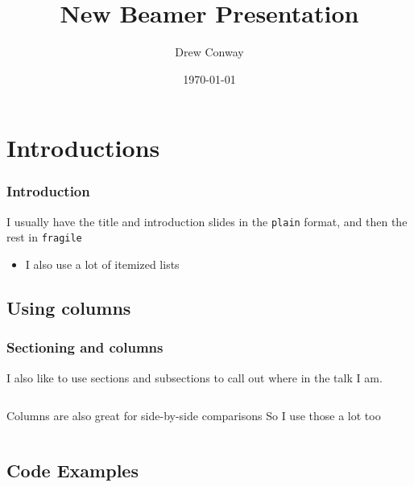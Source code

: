 \documentclass[xcolor=dvipsnames, 9pt]{beamer}
\title{ New Beamer Presentation}
\author{Drew Conway}
\date{\today}
\begin{document}
 

\begin{frame}[plain]
  \titlepage  
\end{frame}

\section{Introductions} %
\label{sec:introductions}


\begin{frame}[plain]
	\frametitle{Introduction}
	I usually have the title and introduction slides in the \texttt{plain} format, and then the rest in \texttt{fragile}
	\begin{itemize}
	   \item I also use a lot of itemized lists
	\end{itemize}
\end{frame}

\subsection{Using columns} %
\label{sub:using_columns}

\begin{frame}[fragile]
    \frametitle{Sectioning and columns}
    I also like to use sections and subsections to call out where in the talk I am.
    \vspace{3cm}
    \begin{columns}
        Columns are also great for side-by-side comparisons
        So I use those a lot too
    \end{columns}
\end{frame}


\subsection{Code Examples} %
\label{sub:code_examples}
\end{document}
